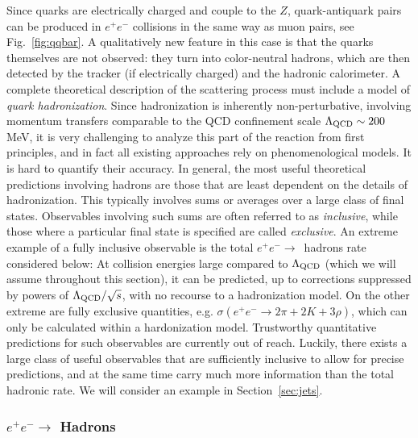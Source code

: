 \documentclass{ws-procs9x6}
\begin{document}
Since quarks are electrically charged and couple to the $Z$, quark-antiquark pairs can be produced in $e^+e^-$ collisions in the same way as muon pairs, see Fig.~\ref{fig:qqbar}. A qualitatively new feature in this case is that the quarks themselves are not observed: they turn into color-neutral hadrons, which are then detected by the tracker (if electrically charged) and the hadronic calorimeter. A complete theoretical description of the scattering process must include a model of {\it quark hadronization}. Since hadronization is inherently non-perturbative, involving momentum transfers comparable to the QCD confinement scale $\Lambda_{\rm QCD}\sim 200$ MeV, it is very challenging to analyze this part of the reaction from first principles, and in fact all existing approaches rely on phenomenological models. It is hard to quantify their accuracy. In general, the most useful theoretical predictions involving hadrons are those that are least dependent on the details of hadronization. This typically involves sums or averages over a large class of final states. Observables involving such sums are often referred to as {\it inclusive}, while those where a particular final state is specified are called {\it exclusive}. An extreme example of a fully inclusive observable is the total $e^+e^-\to$~hadrons rate considered below: At collision energies large compared to $\Lambda_{\rm QCD}$ (which we will assume throughout this section), it can be predicted, up to corrections suppressed by powers of $\Lambda_{\rm QCD}/\sqrt{s}$, with no recourse to a hadronization model. On the other extreme are fully exclusive quantities, e.g. $\sigma(e^+e^-\to 2\pi+2K+3\rho)$, which can only be calculated within a hardonization model. Trustworthy quantitative predictions for such observables are currently out of reach. Luckily, there exists a large class of useful observables that are sufficiently inclusive to allow for precise predictions, and at the same time carry much more information than the total hadronic rate. We will consider an example in Section~\ref{sec:jets}.

\subsubsection{$e^+e^-\to$ Hadrons}
\label{sec:R}
\end{document}
